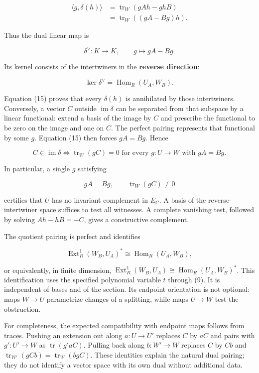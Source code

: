 \documentclass[
  11pt,
]{article}
\begin{document}
\[\begin{aligned}
\langle g,\delta(h)\rangle
&=\operatorname{tr}_W(gAh-ghB)\\
&=\operatorname{tr}_W((gA-Bg)h).
\end{aligned}\tag{15}\]

Thus the dual linear map is

\[\delta^\vee:K\to K,\qquad g\longmapsto gA-Bg.\tag{16}\]

Its kernel consists of the intertwiners in the \textbf{reverse
direction}:

\[\ker\delta^\vee=\operatorname{Hom}_R(U_A,W_B).\tag{17}\]

Equation (15) proves that every \(\delta(h)\) is annihilated by those
intertwiners. Conversely, a vector \(C\) outside
\(\operatorname{im}\delta\) can be separated from that subspace by a
linear functional: extend a basis of the image by \(C\) and prescribe
the functional to be zero on the image and one on \(C\). The perfect
pairing represents that functional by some \(g\). Equation (15) then
forces \(gA=Bg\). Hence

\[\boxed{\ C\in\operatorname{im}\delta
\iff \operatorname{tr}_W(gC)=0
\text{ for every }g:U\to W\text{ with }gA=Bg.\ }\tag{18}\]

In particular, a single \(g\) satisfying

\[gA=Bg,\qquad \operatorname{tr}_W(gC)\ne0\tag{19}\]

certifies that \(U\) has no invariant complement in \(E_C\). A basis of
the reverse-intertwiner space suffices to test all witnesses. A complete
vanishing test, followed by solving \(Ah-hB=-C\), gives a constructive
complement.

The quotient pairing is perfect and identifies

\[\operatorname{Ext}^1_R(W_B,U_A)^*
\cong\operatorname{Hom}_R(U_A,W_B),\tag{20}\]

or equivalently, in finite dimension,
\(\operatorname{Ext}^1_R(W_B,U_A)\cong
\operatorname{Hom}_R(U_A,W_B)^*\). This identification uses the
specified polynomial variable \(t\) through (9). It is independent of
bases and of the section. Its endpoint orientation is not optional: maps
\(W\to U\) parametrize changes of a splitting, while maps \(U\to W\)
test the obstruction.

For completeness, the expected compatibility with endpoint maps follows
from traces. Pushing an extension out along \(a:U\to U'\) replaces \(C\)
by \(aC\) and pairs with \(g':U'\to W\) as \(\operatorname{tr}(g'aC)\).
Pulling back along \(b:W'\to W\) replaces \(C\) by \(Cb\) and
\(\operatorname{tr}_{W'}(gCb)=\operatorname{tr}_W(bgC)\). These
identities explain the natural dual pairing; they do not identify a
vector space with its own dual without additional data.
\end{document}
